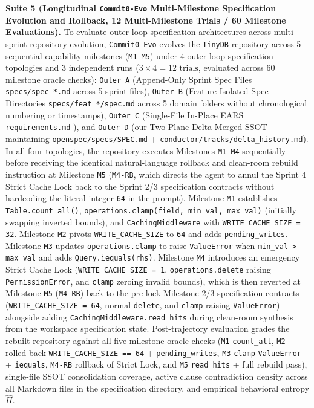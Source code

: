 \documentclass[11pt,a4paper,copyright]{google}
\begin{document}
\textbf{Suite 5 (Longitudinal \texttt{Commit0-Evo} Multi-Milestone Specification Evolution and Rollback, 12 Multi-Milestone Trials / 60 Milestone Evaluations).} To evaluate outer-loop specification architectures across multi-sprint repository evolution, \texttt{Commit0-Evo} evolves the \texttt{TinyDB} repository across 5 sequential capability milestones (\texttt{M1}--\texttt{M5}) under 4 outer-loop specification topologies and 3 independent runs ($3 \times 4 = 12\text{ trials}$, evaluated across $60$ milestone oracle checks): \texttt{Outer A} (Append-Only Sprint Spec Files \texttt{specs/spec\_*.md} across 5 sprint files), \texttt{Outer B} (Feature-Isolated Spec Directories \texttt{specs/feat\_*/spec.md} across 5 domain folders without chronological numbering or timestamps), \texttt{Outer C} (Single-File In-Place EARS \texttt{requirements.md} \cite{mavin2009ears}), and \texttt{Outer D} (our Two-Plane Delta-Merged SSOT maintaining \texttt{openspec/specs/\allowbreak SPEC.md} + \texttt{conductor/tracks/\allowbreak delta\_history.md}). In all four topologies, the repository executes Milestones \texttt{M1}--\texttt{M4} sequentially before receiving the identical natural-language rollback and clean-room rebuild instruction at Milestone \texttt{M5} (\texttt{M4-RB}, which directs the agent to annul the Sprint 4 Strict Cache Lock back to the Sprint 2/3 specification contracts without hardcoding the literal integer \texttt{64} in the prompt). Milestone \texttt{M1} establishes \texttt{Table.count\_all()}, \texttt{operations.clamp(field, min\_val, max\_val)} (initially swapping inverted bounds), and \texttt{CachingMiddleware} with \texttt{WRITE\_CACHE\_SIZE = 32}. Milestone \texttt{M2} pivots \texttt{WRITE\_CACHE\_SIZE} to \texttt{64} and adds \texttt{pending\_writes}. Milestone \texttt{M3} updates \texttt{operations.clamp} to raise \texttt{ValueError} when \texttt{min\_val > max\_val} and adds \texttt{Query.iequals(rhs)}. Milestone \texttt{M4} introduces an emergency Strict Cache Lock (\texttt{WRITE\_CACHE\_SIZE = 1}, \texttt{operations.delete} raising \texttt{PermissionError}, and \texttt{clamp} zeroing invalid bounds), which is then reverted at Milestone \texttt{M5} (\texttt{M4-RB}) back to the pre-lock Milestone 2/3 specification contracts (\texttt{WRITE\_CACHE\_SIZE = 64}, normal \texttt{delete}, and \texttt{clamp} raising \texttt{ValueError}) alongside adding \texttt{CachingMiddleware.read\_hits} during clean-room synthesis from the workspace specification state. Post-trajectory evaluation grades the rebuilt repository against all five milestone oracle checks (\texttt{M1} \texttt{count\_all}, \texttt{M2} rolled-back \texttt{WRITE\_CACHE\_SIZE == 64} + \texttt{pending\_writes}, \texttt{M3} \texttt{clamp} \texttt{ValueError} + \texttt{iequals}, \texttt{M4-RB} rollback of Strict Lock, and \texttt{M5} \texttt{read\_hits} + full rebuild pass), single-file SSOT consolidation coverage, active clause contradiction density across all Markdown files in the specification directory, and empirical behavioral entropy $\hat{H}$.
\end{document}
